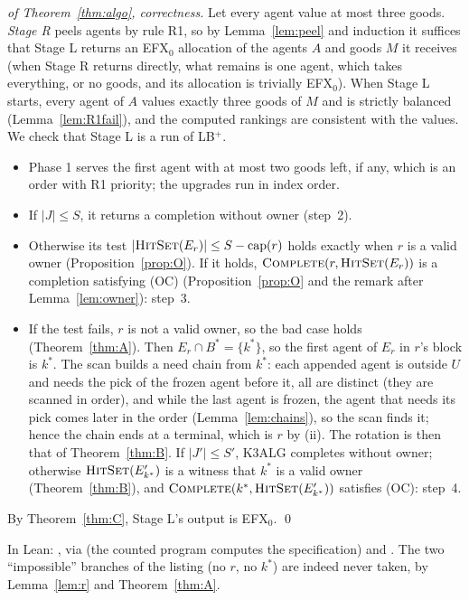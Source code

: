 \documentclass[runningheads,11pt]{llncs}
\newcommand{\efxz}{\texorpdfstring{\mbox{EFX$_0$}}{EFX0}}
\newcommand{\LBp}{\texorpdfstring{\mbox{LB$^{+}$}}{LB+}}
\newcommand{\capa}{\mathrm{cap}}
\newcommand{\HitSet}{\textup{\textsc{HitSet}}}
\newcommand{\Complete}{\textup{\textsc{Complete}}}
\begin{document}
\begin{proof}[of Theorem~\ref{thm:algo}, correctness]
Let every agent value at most three goods. \emph{Stage R} peels agents by rule R1, so by Lemma~\ref{lem:peel} and induction it suffices that Stage L returns an \efxz{} allocation of the agents $A$ and goods $M$ it receives (when Stage R returns directly, what remains is one agent, which takes everything, or no goods, and its allocation is trivially \efxz{}). When Stage L starts, every agent of $A$ values exactly three goods of $M$ and is strictly balanced (Lemma~\ref{lem:R1fail}), and the computed rankings are consistent with the values. We check that Stage L is a run of \LBp{}.
\begin{itemize}
\item Phase 1 serves the first agent with at most two goods left, if any, which is an order with R1 priority; the upgrades run in index order.
\item If $|J|\le S$, it returns a completion without owner (step~2).
\item Otherwise its test $|\HitSet(E_r)|\le S-\capa(r)$ holds exactly when $r$ is a valid owner (Proposition~\ref{prop:O}). If it holds, $\Complete(r,\HitSet(E_r))$ is a completion satisfying (OC) (Proposition~\ref{prop:O} and the remark after Lemma~\ref{lem:owner}): step~3.
\item If the test fails, $r$ is not a valid owner, so the bad case holds (Theorem~\ref{thm:A}). Then $E_r\cap B^*=\{k^*\}$, so the first agent of $E_r$ in $r$'s block is $k^*$. The scan builds a need chain from $k^*$: each appended agent is outside $U$ and needs the pick of the frozen agent before it, all are distinct (they are scanned in order), and while the last agent is frozen, the agent that needs its pick comes later in the order (Lemma~\ref{lem:chains}), so the scan finds it; hence the chain ends at a terminal, which is $r$ by (ii). The rotation is then that of Theorem~\ref{thm:B}. If $|J'|\le S'$, K3ALG completes without owner; otherwise $\HitSet(E'_{k^*})$ is a witness that $k^*$ is a valid owner (Theorem~\ref{thm:B}), and $\Complete(k^*,\HitSet(E'_{k^*}))$ satisfies (OC): step~4.
\end{itemize}
By Theorem~\ref{thm:C}, Stage L's output is \efxz{}. \qed
\end{proof}

\noindent In Lean: , via  (the counted program computes the specification) and . The two ``impossible'' branches of the listing (no $r$, no $k^*$) are indeed never taken, by Lemma~\ref{lem:r} and Theorem~\ref{thm:A}.
\end{document}
